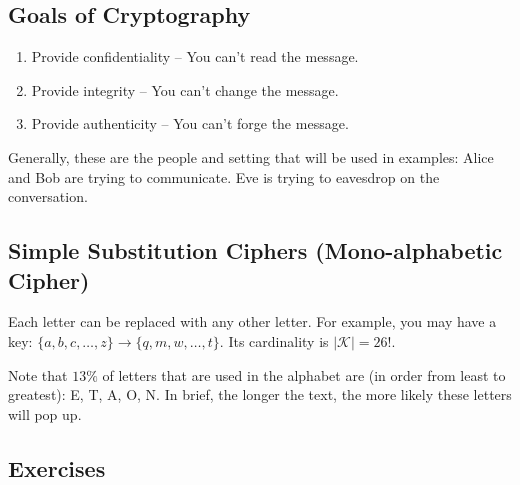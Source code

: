 \subsection{Goals of Cryptography}

\begin{enumerate}
    \item Provide confidentiality -- You can't read the message.
    \item Provide integrity -- You can't change the message.
    \item Provide authenticity -- You can't forge the message.
\end{enumerate}

Generally, these are the people and setting that will be used in examples: Alice and Bob are trying to communicate. Eve is trying to eavesdrop on the conversation. \\

\subsection{Simple Substitution Ciphers (Mono-alphabetic Cipher)}

Each letter can be replaced with any other letter. For example, you may have a key: \(\{a,b,c,\dots,z\} \rightarrow \{q,m,w,\dots,t\}\). Its cardinality is \(|\mathcal{K}| = 26!\). \\



 Note that \(13\%\) of letters that are used in the alphabet are (in order from least to greatest): E, T, A, O, N. In brief, the longer the text, the more likely these letters will pop up.

\renewcommand{\theenumi}{\alph{enumi}}
\renewcommand{\labelenumi}{(\theenumi)}
\subsection{Exercises}


